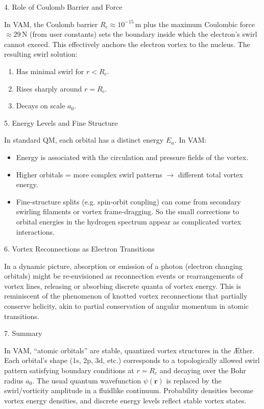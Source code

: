 4. Role of Coulomb Barrier and Force

In VAM, the Coulomb barrier \(R_c \approx 10^{-15}\,\mathrm{m}\) plus the maximum Coulombic force \(\approx 29\,\mathrm{N}\) (from user constants) sets the boundary inside which the electron’s swirl cannot exceed. This effectively anchors the electron vortex to the nucleus. The resulting swirl solution:

\begin{enumerate}
\item Has minimal swirl for \(r < R_c\).
\item Rises sharply around \(r = R_c\).
\item Decays on scale \(a_0\).
\end{enumerate}

5. Energy Levels and Fine Structure

In standard QM, each orbital has a distinct energy \(E_n\). In VAM:

\begin{itemize}
\item Energy is associated with the circulation and pressure fields of the vortex.
\item Higher orbitals = more complex swirl patterns \(\rightarrow\) different total vortex energy.
\item Fine‐structure splits (e.g. spin‐orbit coupling) can come from secondary swirling filaments or vortex frame‐dragging. So the small corrections to orbital energies in the hydrogen spectrum appear as complicated vortex interactions.
\end{itemize}

6. Vortex Reconnections as Electron Transitions

In a dynamic picture, absorption or emission of a photon (electron changing orbitals) might be re‐envisioned as reconnection events or rearrangements of vortex lines, releasing or absorbing discrete quanta of vortex energy. This is reminiscent of the phenomenon of knotted vortex reconnections that partially conserve helicity, akin to partial conservation of angular momentum in atomic transitions.

7. Summary

In VAM, “atomic orbitals” are stable, quantized vortex structures in the Æther. Each orbital’s shape (1s, 2p, 3d, etc.) corresponds to a topologically allowed swirl pattern satisfying boundary conditions at \(r = R_c\) and decaying over the Bohr radius \(a_0\). The usual quantum wavefunction \(\psi(\mathbf{r})\) is replaced by the swirl/vorticity amplitude in a fluidlike continuum. Probability densities become vortex energy densities, and discrete energy levels reflect stable vortex states.



